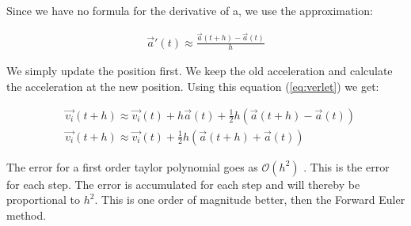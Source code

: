 Since we have no formula for the derivative of a, we use the approximation: 

\begin{align*}
	\vec{a}'(t) \approx \frac{\vec{a}(t+h) - \vec{a}(t)}{h}
\end{align*}

We simply update the position first. We keep the old acceleration and calculate the acceleration at the new position.  Using this equation (\ref{eq:verlet}) we get: 

\begin{align*}
	&\vec{v_i}(t+h) \approx \vec{v_i}(t) + h \vec{a}(t) + \frac{1}{2} h(\vec{a}(t+h) - \vec{a}(t))
	\\
	&\vec{v_i}(t+h) \approx \vec{v_i}(t) + \frac{1}{2} h(\vec{a}(t+h) + \vec{a}(t))
\end{align*}

The error for a first order taylor polynomial goes as $\mathcal{O}(h^2)$ . This is the error for each step. The error is accumulated for each step and will thereby be proportional to $h^2$. This is one order of magnitude better, then the Forward Euler method. 
















